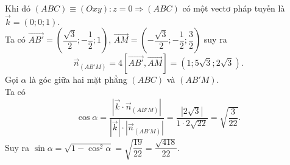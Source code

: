 \begin{ex}
{		 Khi đó $(ABC) \equiv(Oxy)\colon z=0 \Rightarrow(ABC)$ có một vectơ pháp tuyến là $\vec{k}=(0;0;1)$.\\
		Ta có $\overrightarrow{AB'}=\left(\dfrac{\sqrt{3}}{2} ;-\dfrac{1}{2};1\right)$, $\overrightarrow{AM}=\left(-\dfrac{\sqrt{3}}{2};-\dfrac{1}{2};\dfrac{3}{2}\right)$ suy ra $$\overrightarrow{n}_{\left(AB'M\right)}=4\left[\overrightarrow{AB'},\overrightarrow{AM}\right]=\left(1;5\sqrt{3};2\sqrt{3}\right).$$
		 Gọi $\alpha$ là góc giữa hai mặt phẳng $(ABC)$ và $(AB'M)$.\\
		 Ta có $$\cos \alpha=\dfrac{\left|\vec{k}\cdot \vec{n}_{\left(AB'M\right)}\right|}{|\vec{k}| \cdot\left|\overrightarrow{n}_{\left(AB'M\right)}\right|}=\dfrac{|2 \sqrt{3}|}{1\cdot 2 \sqrt{22}}=\sqrt{\dfrac{3}{22}}.$$
		 Suy ra $\sin \alpha=\sqrt{1-\cos ^2 \alpha}=\sqrt{\dfrac{19}{22}}=\dfrac{\sqrt{418}}{22}$.
	}
\end{ex}


